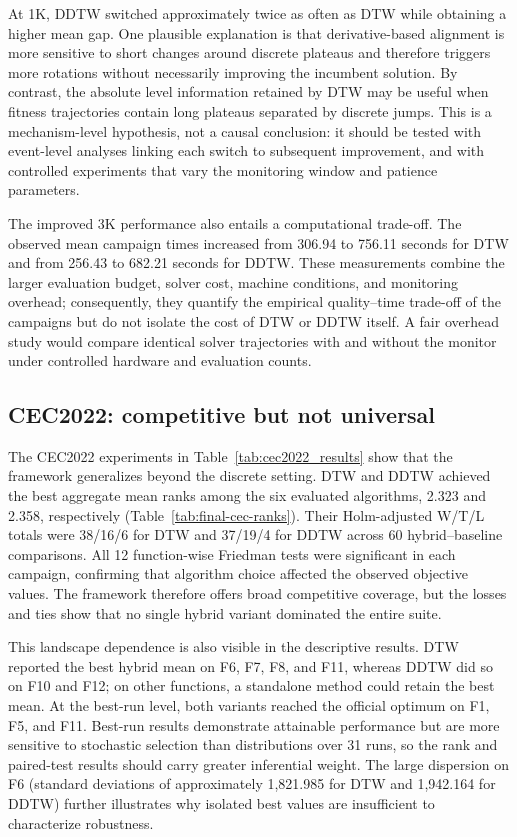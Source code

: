 At 1K, DDTW switched approximately twice as often as DTW while obtaining a
higher mean gap. One plausible explanation is that derivative-based alignment
is more sensitive to short changes around discrete plateaus and therefore
triggers more rotations without necessarily improving the incumbent solution.
By contrast, the absolute level information retained by DTW may be useful when
fitness trajectories contain long plateaus separated by discrete jumps. This
is a mechanism-level hypothesis, not a causal conclusion: it should be tested
with event-level analyses linking each switch to subsequent improvement, and
with controlled experiments that vary the monitoring window and patience
parameters.

The improved 3K performance also entails a computational trade-off. The
observed mean campaign times increased from 306.94 to 756.11 seconds for DTW
and from 256.43 to 682.21 seconds for DDTW. These measurements combine the
larger evaluation budget, solver cost, machine conditions, and monitoring
overhead; consequently, they quantify the empirical quality--time trade-off of
the campaigns but do not isolate the cost of DTW or DDTW itself. A fair overhead
study would compare identical solver trajectories with and without the monitor
under controlled hardware and evaluation counts.

\subsection{CEC2022: competitive but not universal}
\label{sec:discussion-cec2022}

The CEC2022 experiments in Table~\ref{tab:cec2022_results} show that the
framework generalizes beyond the discrete setting. DTW and DDTW achieved the
best aggregate mean ranks among the six evaluated algorithms, 2.323 and 2.358,
respectively (Table~\ref{tab:final-cec-ranks}). Their Holm-adjusted W/T/L
totals were 38/16/6 for DTW and 37/19/4 for DDTW across 60
hybrid--baseline comparisons. All 12 function-wise Friedman tests were
significant in each campaign, confirming that algorithm choice affected the
observed objective values. The framework therefore offers broad competitive
coverage, but the losses and ties show that no single hybrid variant dominated
the entire suite.

This landscape dependence is also visible in the descriptive results. DTW
reported the best hybrid mean on F6, F7, F8, and F11, whereas DDTW did so on
F10 and F12; on other functions, a standalone method could retain the best
mean. At the best-run level, both variants reached the official optimum on F1,
F5, and F11. Best-run results demonstrate attainable performance but are more
sensitive to stochastic selection than distributions over 31 runs, so the
rank and paired-test results should carry greater inferential weight. The large
dispersion on F6 (standard deviations of approximately 1,821.985 for DTW and
1,942.164 for DDTW) further illustrates why isolated best values are
insufficient to characterize robustness.

